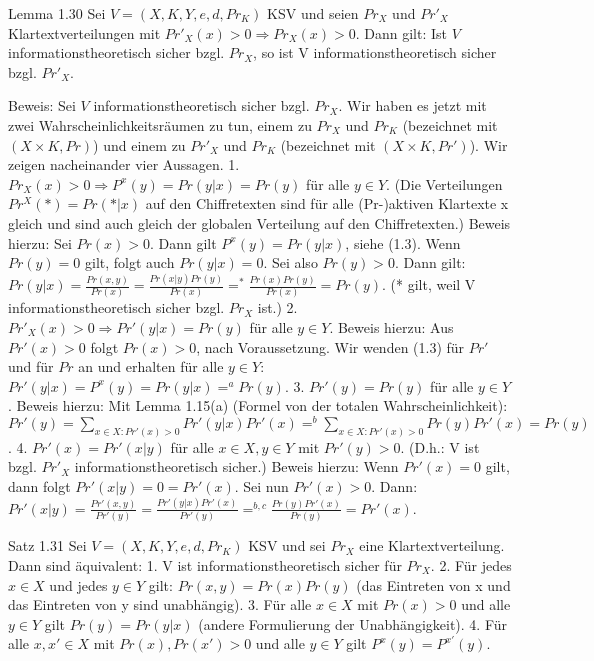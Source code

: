\documentclass[a4paper]{article}
\begin{document}
\begin{multicols}{3}
Lemma 1.30 Sei $V=(X,K,Y,e,d,Pr_K)$ KSV und seien $Pr_X$ und $Pr′_X$ Klartextverteilungen mit $Pr′_X(x)>0\Rightarrow Pr_X(x)>0$. Dann gilt: Ist $V$ informationstheoretisch sicher bzgl. $Pr_X$, so ist V informationstheoretisch sicher bzgl. $Pr′_X$.

Beweis: Sei $V$ informationstheoretisch sicher bzgl. $Pr_X$. Wir haben es jetzt mit zwei Wahrscheinlichkeitsräumen zu tun, einem zu $Pr_X$ und $Pr_K$ (bezeichnet mit $(X\times K,Pr)$) und einem zu $Pr′_X$ und $Pr_K$ (bezeichnet mit $(X\times K,Pr′)$).
Wir zeigen nacheinander vier Aussagen.
1. $Pr_X(x)> 0 \Rightarrow P^x(y) = Pr(y|x) = Pr(y)$ für alle $y\in Y$. (Die Verteilungen $Pr^X(*)=Pr(*|x)$ auf den Chiffretexten sind für alle (Pr-)aktiven Klartexte x gleich und sind auch gleich der globalen Verteilung auf den Chiffretexten.) Beweis hierzu: Sei $Pr(x)>0$. Dann gilt $P^x(y)=Pr(y|x)$, siehe (1.3). Wenn $Pr(y)=0$ gilt, folgt auch $Pr(y|x)=0$. Sei also $Pr(y)>0$. Dann gilt: $Pr(y|x) =\frac{Pr(x,y)}{Pr(x)}=\frac{Pr(x|y)Pr(y)}{Pr(x)}=^* \frac{Pr(x)Pr(y)}{Pr(x)}= Pr(y)$. (* gilt, weil V informationstheoretisch sicher bzgl. $Pr_X$ ist.)
2. $Pr′_X(x)> 0 \Rightarrow Pr′(y|x) = Pr(y)$ für alle $y\in Y$. Beweis hierzu: Aus $Pr′(x)>0$ folgt $Pr(x)>0$, nach Voraussetzung. Wir wenden (1.3) für $Pr′$ und für $Pr$ an und erhalten für alle $y\in Y$: $Pr′(y|x)=P^x(y)=Pr(y|x)=^a Pr(y)$.
3. $Pr′(y)=Pr(y)$ für alle $y\in Y$. Beweis hierzu: Mit Lemma 1.15(a) (Formel von der totalen Wahrscheinlichkeit): $Pr′(y)=\sum_{x\in X: Pr′(x)> 0} Pr′(y|x)Pr′(x)=^b \sum_{x\in X: Pr′(x)> 0} Pr(y)Pr′(x) = Pr(y)$.
4. $Pr′(x)=Pr′(x|y)$ für alle $x\in X,y\in Y$ mit $Pr′(y)>0$. (D.h.: V ist bzgl. $Pr′_X$ informationstheoretisch sicher.) Beweis hierzu: Wenn $Pr′(x)=0$ gilt, dann folgt $Pr′(x|y)=0=Pr′(x)$. Sei nun $Pr′(x)>0$. Dann: $Pr′(x|y)=\frac{Pr′(x,y)}{Pr′(y)}=\frac{Pr′(y|x)Pr′(x)}{Pr′(y)}=^{b,c} \frac{Pr(y)Pr′(x)}{Pr(y)} = Pr′(x)$.

Satz 1.31 Sei $V=(X,K,Y,e,d,Pr_K)$ KSV und sei $Pr_X$ eine Klartextverteilung. Dann sind äquivalent:
1. V ist informationstheoretisch sicher für $Pr_X$.
2. Für jedes $x\in X$ und jedes $y\in Y$ gilt: $Pr(x,y)=Pr(x)Pr(y)$ (das Eintreten von x und das Eintreten von y sind unabhängig).
3. Für alle $x\in X$ mit $Pr(x)>0$ und alle $y\in Y$ gilt $Pr(y)=Pr(y|x)$ (andere Formulierung der Unabhängigkeit).
4. Für alle $x,x′\in X$ mit $Pr(x),Pr(x′)>0$ und alle $y\in Y$ gilt $P^x(y)=P^{x′}(y)$.


\end{multicols}
\end{document}
